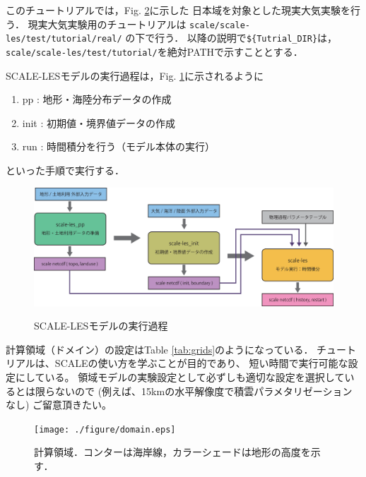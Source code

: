 
このチュートリアルでは，Fig. \ref{fig:domain}に示した
日本域を対象とした現実大気実験を行う．
現実大気実験用のチュートリアルは
\verb|scale/scale-les/test/tutorial/real/| の下で行う．
以降の説明で\verb|${Tutrial_DIR}|は，\verb|scale/scale-les/test/tutorial/|を絶対PATHで示すこととする．

SCALE-LESモデルの実行過程は，Fig. \ref{fig:howto}に示されるように
\begin{enumerate}
\item pp : 地形・海陸分布データの作成
\item init : 初期値・境界値データの作成
\item run : 時間積分を行う（モデル本体の実行）
\end{enumerate}
といった手順で実行する．


\begin{figure}[h]
\begin{center}
  \includegraphics[width=0.9\hsize]{./figure/how_to_run.eps}\\
  \caption{SCALE-LESモデルの実行過程}
  \label{fig:howto}
\end{center}
\end{figure}

計算領域（ドメイン）の設定はTable \ref{tab:grids}のようになっている．
チュートリアルは、SCALEの使い方を学ぶことが目的であり、
短い時間で実行可能な設定にしている。
領域モデルの実験設定として必ずしも適切な設定を選択しているとは限らないので
(例えば、15kmの水平解像度で積雲パラメタリゼーションなし)
ご留意頂きたい。

\begin{figure}[h]
\begin{center}
  \texttt{[image: ./figure/domain.eps]}\\
  \caption{計算領域．コンターは海岸線，カラーシェードは地形の高度を示す．}
  \label{fig:domain}
\end{center}
\end{figure}

